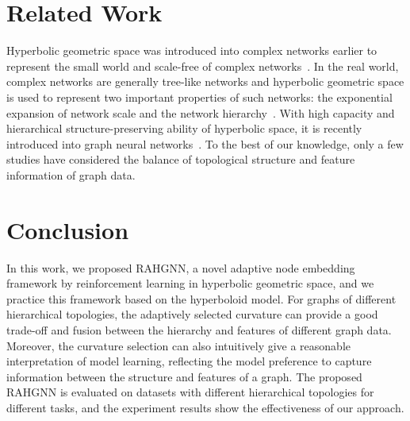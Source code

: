 \section{Related Work}\label{section 2}

Hyperbolic geometric space was introduced into complex networks earlier to represent the small world and scale-free of complex networks~\cite{Krioukov2010Hyperbolic,papadopoulos2012popularity}. 
In the real world, complex networks are generally tree-like networks and hyperbolic geometric space is used to represent two important properties of such networks: the exponential expansion of network scale and the network hierarchy~\cite{Krioukov2010Hyperbolic}. 
With high capacity and hierarchical structure-preserving ability of hyperbolic space, it is recently introduced into graph neural networks~\cite{HGNN_Qi,HGCN_ChamiYRL19,HAT}. 
To the best of our knowledge, only a few studies have considered the balance of topological structure and feature information of graph data. 

\section{Conclusion}
In this work, we proposed RAHGNN, a novel adaptive node embedding framework by reinforcement learning in hyperbolic geometric space, and we practice this framework based on the hyperboloid model. 
For graphs of different hierarchical topologies, the adaptively selected curvature can provide a good trade-off and fusion between the hierarchy and features of different graph data. 
Moreover, the curvature selection can also intuitively give a reasonable interpretation of model learning, reflecting the model preference to capture information between the structure and features of a graph. 
The proposed RAHGNN is evaluated on datasets with different hierarchical topologies for different tasks, and the experiment results show the effectiveness of our approach. 